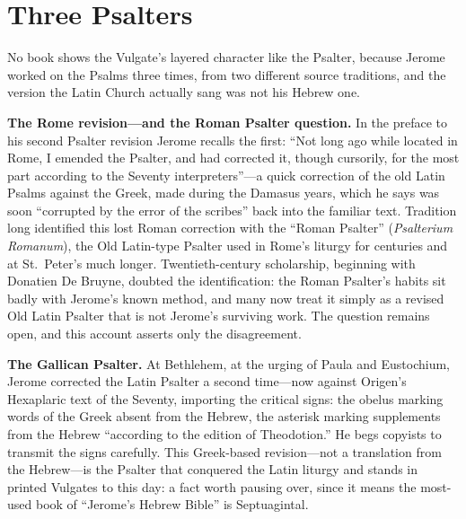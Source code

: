 \section{Three Psalters}

No book shows the Vulgate's layered character like the Psalter, because
Jerome worked on the Psalms three times, from two different source
traditions, and the version the Latin Church actually sang was not his
Hebrew one.

\textbf{The Rome revision---and the Roman Psalter question.} In the
preface to his second Psalter revision Jerome recalls the first: ``Not
long ago while located in Rome, I emended the Psalter, and had corrected
it, though cursorily, for the most part according to the Seventy
interpreters''---a quick correction of the old Latin Psalms against the
Greek, made during the Damasus years, which he says was soon ``corrupted
by the error of the scribes'' back into the familiar
text. Tradition long identified this lost Roman correction with the
``Roman Psalter'' (\textit{Psalterium Romanum}), the Old Latin-type
Psalter used in Rome's liturgy for centuries and at St.~Peter's much
longer. Twentieth-century scholarship, beginning with Donatien De
Bruyne, doubted the identification: the Roman Psalter's habits sit badly
with Jerome's known method, and many now treat it simply as a revised Old
Latin Psalter that is not Jerome's surviving work. The question remains
open, and this account asserts only the disagreement.

\textbf{The Gallican Psalter.} At Bethlehem, at the urging of Paula and
Eustochium, Jerome corrected the Latin Psalter a second time---now against
Origen's Hexaplaric text of the Seventy, importing the critical signs:
the obelus marking words of the Greek absent from the Hebrew, the
asterisk marking supplements from the Hebrew ``according to the edition
of Theodotion.'' He begs copyists to transmit the signs
carefully. This Greek-based revision---not a translation from the
Hebrew---is the Psalter that conquered the Latin liturgy and stands in
printed Vulgates to this day: a fact worth pausing over, since it means
the most-used book of ``Jerome's Hebrew Bible'' is Septuagintal.

